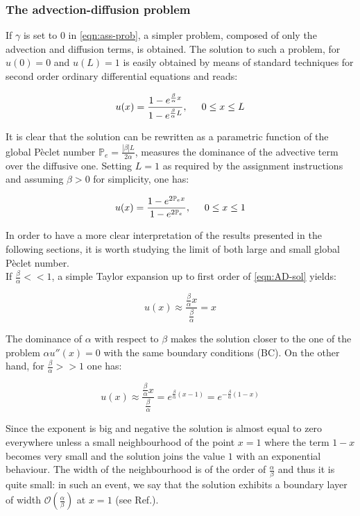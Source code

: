 \documentclass[11pt]{article}
\theoremstyle{theorem}
\theoremstyle{definition}
\begin{document}
\subsubsection{The advection-diffusion problem}
If $\gamma$ is set to $0$ in \eqref{eqn:ass-prob}, a simpler problem, composed of only the advection and diffusion terms, is obtained. The solution to such a problem, for $u(0)=0$ and $u(L)=1$ is easily obtained by means of standard techniques for second order ordinary differential equations and reads:

\begin{align}
	\label{eqn:AD-sol}
	u(x)=\frac{1-e^{\frac{\beta}{\alpha}x}}{1-e^{\frac{\beta}{\alpha}L}},\hspace{5mm} 0\le x\le L
\end{align}

It is clear that the solution can be rewritten as a parametric function of the global P\`{e}clet number $\mathbb{P}_e=\frac{|\beta|L}{2\alpha}$, measures the dominance of the advective term over the diffusive one. Setting $L=1$ as required by the assignment instructions and assuming $\beta>0$ for simplicity, one has:

$$	u(x)=\frac{1-e^{2\mathbb{P}_ex}}{1-e^{2\mathbb{P}_e}}, \hspace{5mm} 0\le x\le 1 $$

In order to have a more clear interpretation of the results presented in the following sections, it is worth studying the limit of both large and small global P\`{e}clet number.\\
If $\frac{\beta}{\alpha}<<1$, a simple Taylor expansion up to first order of \eqref{eqn:AD-sol} yields:

\begin{equation}
	\label{key:AD-smallP}
	u(x)\approx\frac{\frac{\beta}{\alpha}x}{\frac{\beta}{\alpha}}=x
\end{equation}

The dominance of $\alpha$ with respect to $\beta$ makes the solution closer to the one of the problem $\alpha u''(x)=0$ with the same boundary conditions (BC). On the other hand, for $\frac{\beta}{\alpha}>>1$ one has:

\begin{equation}
\label{key:AD-bigP}
u(x)\approx\frac{\frac{\beta}{\alpha}x}{\frac{\beta}{\alpha}}=e^{\frac{\beta}{\alpha}(x-1)}=e^{-\frac{\beta}{\alpha}(1-x)}
\end{equation}

Since the exponent is big and negative the solution is almost equal to zero everywhere unless a small neighbourhood of the point $x=1$ where the term $ 1-x $ becomes very small and the solution joins the value $1$ with an exponential behaviour. The width of the neighbourhood is of the order of $\frac{\alpha}{\beta}$ and thus it is quite small: in such an event, we say that the solution exhibits a boundary layer of width $\mathcal{O}\left(\frac{\alpha}{\beta}\right)$ at $x=1$ (see Ref.\cite{numerical-math}).
\end{document}
